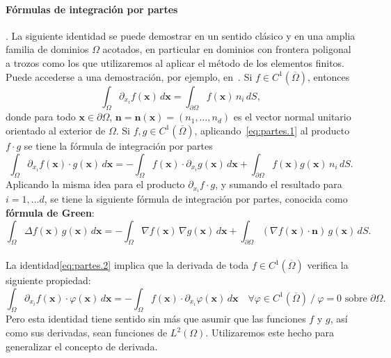 \documentclass[11pt]{article}
\theoremstyle{plain}
\theoremstyle{definition}
\newcounter{stepnum}[section]
\newcommand{\step}[1][]{\bigskip\noindent\textbf{\thesection.\refstepcounter{stepnum}\thestepnum}.\enspace{#1}}
\renewcommand{\step}[1][]{\paragraph{#1}\hspace{-1.1em}}
\newcommand{\deff}[1]{\textit{\textbf{#1}}}
\newcommand{\R}{\ensuremath{\mathbb{R}}}
\newcommand{\xx}{\ensuremath{\mathbf{x}}\xspace}
\newcommand{\ff}{\ensuremath{\mathbf{f}}\xspace}
\newcommand{\nn}{\ensuremath{\mathbf{n}}\xspace}
\renewcommand{\div}{\ensuremath{\nabla\cdot}}
\begin{document}
\step[\textbf{Fórmulas de integración por partes}].
La siguiente identidad se puede demostrar en un sentido clásico y en una amplia familia de dominios $\Omega$ acotados, en particular en dominios con frontera poligonal a trozos como los que utilizaremos al aplicar el método de los elementos finitos. Puede accederse a una demostración, por ejemplo, en~\cite{sayas2019variational}.
Si $f\in C^1(\overline\Omega)$, entonces
\begin{equation}
  \label{eq:partes.1}
  \int_\Omega \partial_{x_i} f(\xx) \, d\xx =
  \int_{\partial\Omega} f(\xx)\,n_i \, dS,
\end{equation}
donde para todo $\xx\in\partial\Omega$, $\nn=\nn(\xx)=(n_1,\dots,n_d)$ es el vector normal unitario orientado al exterior de $\Omega$.
Si $f,g\in C^1(\overline\Omega)$, aplicando~\eqref{eq:partes.1} al producto $f\cdot g$ 
se tiene la fórmula de integración por partes
\begin{equation}
  \label{eq:partes.2}
  \int_\Omega \partial_{x_i}f(\xx)\cdot g(\xx) \, d\xx    =
  - \int_\Omega f(\xx)\cdot \partial_{x_i}g(\xx) \, d\xx    
  +
  \int_{\partial\Omega} f(\xx)g(\xx)\,n_i \, dS.
\end{equation}
Aplicando la misma idea para el producto $\partial_{x_i} f \cdot g$, y sumando el resultado para $i=1,\dots d$, se tiene la siguiente fórmula de integración por partes, conocida como \textbf{fórmula de Green}:
\begin{equation}
\label{eq:green}
\int_\Omega \Delta f(\xx)\, g(\xx) \, d\xx =
- \int_\Omega \nabla f(\xx)\, \nabla g(\xx) \, d\xx
+ \int_{\partial\Omega} (\nabla f(\xx)\cdot\nn)\, g(\xx)  \, dS.
\end{equation}
\step
La identidad\eqref{eq:partes.2} implica que la derivada de toda $f\in C^1(\overline\Omega)$ verifica la siguiente propiedad:
\begin{equation}
  \label{eq:partes.3}
  \int_\Omega \partial_{x_i}f(\xx)\cdot \varphi(\xx) \, d\xx    =
  - \int_\Omega f(\xx)\cdot \partial_{x_i}\varphi(\xx) \, d\xx    \quad \forall \varphi\in C^1(\overline\Omega)  \ / \ \varphi=0 \text{ sobre }\partial\Omega.
\end{equation}
Pero esta identidad tiene sentido sin más que asumir que las funciones $f$ y $g$, así como sus derivadas, sean funciones de $L^2(\Omega)$. Utilizaremos este hecho para generalizar el concepto de derivada.
\end{document}
